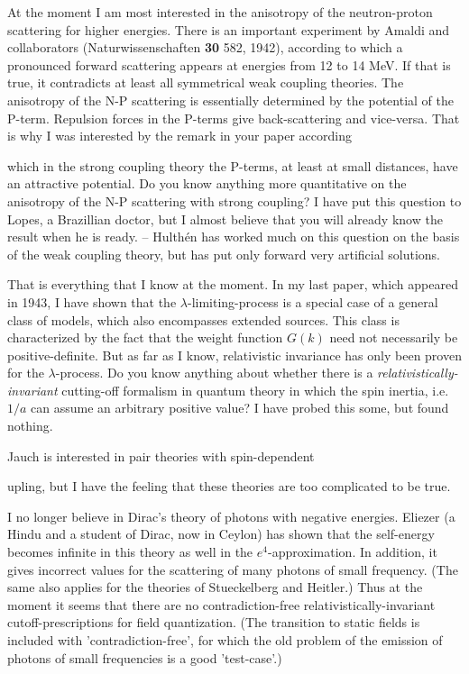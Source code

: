 At the moment I am most interested in the anisotropy of the neutron-proton scattering for higher energies. There is an important experiment by Amaldi and collaborators (Naturwissenschaften \textbf{30} 582, 1942), according to which a pronounced forward scattering appears at energies from 12 to 14 MeV. If that is true, it contradicts at least all symmetrical weak coupling theories. The anisotropy of the N-P scattering is essentially determined by the potential of the P-term. Repulsion forces in the P-terms give back-scattering and vice-versa. That is why I was interested by the remark in your paper according 

 which in the strong coupling theory the P-terms, at least at small distances, have an attractive potential. Do you know anything more quantitative on the anisotropy of the N-P scattering with strong coupling? I have put this question to Lopes, a Brazillian doctor, but  I almost believe that you will already know the result when he is ready. -- Hulth\'en has worked much on this question on the basis of the weak coupling theory, but has put only forward very artificial solutions.
 
That is everything that I know at the moment. In my last paper, which appeared in 1943, I have shown that the $\lambda$-limiting-process is a special case of a general class of models, which also encompasses extended sources. This class is characterized by the fact that the weight function $G(k)$ need not necessarily be positive-definite. But as far as I know, relativistic invariance has only been proven for the $\lambda$-process. Do you know anything about whether there is a \textit{relativistically-invariant} cutting-off formalism in quantum theory in which the spin inertia, i.e. $1/a$ can assume an arbitrary positive value? I have probed this some, but found nothing.

Jauch is interested in pair theories with spin-dependent 

upling, but I have the feeling that these theories are too complicated to be true.

I no longer believe in Dirac's theory of photons with negative energies. Eliezer (a Hindu and a student of Dirac, now in Ceylon) has shown that the self-energy becomes infinite in this theory as well in the $e^4$-approximation. In addition, it gives incorrect values for the scattering of many photons of small frequency. (The same also applies for the theories of Stueckelberg and Heitler.) Thus at the moment it seems that there are no contradiction-free relativistically-invariant cutoff-prescriptions for field quantization. (The transition to static fields is included with 'contradiction-free', for which the old problem of the emission of photons of small frequencies is a good 'test-case'.)

